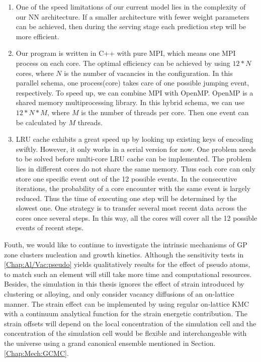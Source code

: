 \begin{enumerate}

  \item One of the speed limitations of our current model lies in the complexity of our \ac{NN} architecture. If a smaller architecture with fewer weight parameters can be achieved, then during the serving stage each prediction step will be more efficient.

  \item Our program is written in C++ with pure \ac{MPI}, which means one \ac{MPI} process on each core. The optimal efficiency can be achieved by using $12*N$ cores, where $N$ is the number of vacancies in the configuration. In this parallel schema, one process(core) takes care of one possible jumping event, respectively. To speed up, we can combine \ac{MPI} with OpenMP. OpenMP is a shared memory multiprocessing library. In this hybrid schema, we can use $12*N*M$, where $M$ is the number of threads per core. Then one event can be calculated by $M$ threads.

  \item \ac{LRU} cache exhibits a great speed up by looking up existing keys of encoding swiftly. However, it only works in a serial version for now. One problem needs to be solved before multi-core \ac{LRU} cache can be implemented. The problem lies in different cores do not share the same memory. Thus each core can only store one specific event out of the 12 possible events. In the consecutive iterations, the probability of a core encounter with the same event is largely reduced. Thus the time of executing one step will be determined by the slowest one. One strategy is to transfer several most recent data across the cores once several steps. In this way, all the cores will cover all the 12 possible events of recent steps.

\end{enumerate}

Fouth, we would like to continue to investigate the intrinsic mechanisms of GP zone clusters nucleation and growth kinetics. Although the sensitivity tests in \ref{Chap:Al/Vac:pseudo} yields qualitatively results for the effect of pseudo atoms, to match such an element will still take more time and computational resources. Besides, the simulation in this thesis ignores the effect of strain introduced by clustering or alloying, and only consider vacancy diffusions of an on-lattice manner. The strain effect can be implemented by using regular on-lattice \ac{KMC} with a continuum analytical function for the strain energetic contribution. The strain offsets will depend on the local concentration of the simulation cell and the concentration of the simulation cell would be flexible and interchangeable with the universe using a grand canonical ensemble mentioned in Section. \ref{Chap:Mech:GCMC}.

